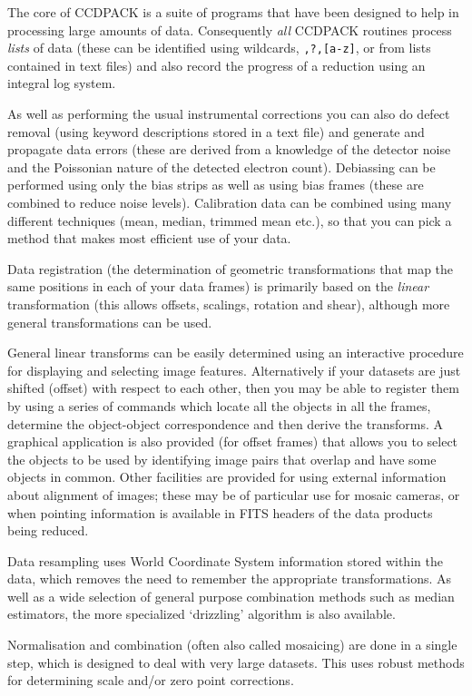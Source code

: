 \documentclass[twoside,11pt]{article}
\renewcommand{\_}{\texttt{\symbol{95}}}
\newcommand{\text}[1]{{\small \tt #1}}
\begin{document}
The core of CCDPACK is a suite of programs that have been designed to
help in processing large amounts of data.  Consequently {\em all}
CCDPACK routines process {\em lists} of data (these can be identified
using wildcards, \text{*,?,[a-z]}, or from lists contained in
text files) and also record the progress of a reduction using an
integral log system.

As well as performing the usual instrumental corrections you can
also do defect removal (using keyword descriptions stored in a text file)
and generate and propagate data errors (these are derived from a knowledge
of the detector noise and the Poissonian nature of the detected
electron count).
Debiassing can be performed using only the bias strips as well as
using bias frames (these are combined to reduce noise levels).
Calibration data can be combined using many different techniques
(mean, median, trimmed mean etc.), so that you can pick a method that
makes most efficient use of your data.

Data registration (the determination of geometric transformations that
map the same positions in each of your data frames) is primarily based
on the {\em linear} transformation (this allows offsets, scalings,
rotation and shear), although more general transformations can be
used.

General linear transforms can be easily determined using an
interactive procedure for displaying and selecting image features.
Alternatively if your datasets are just shifted (offset) with respect
to each other, then you may be able to register them by using a series
of commands which locate all the objects in all the frames,
determine the object-object correspondence and then derive the
transforms.
A graphical application is also provided (for offset frames) that allows
you to select the objects to be used by identifying image pairs that
overlap and have some objects in common.
Other facilities are provided for using external information about
alignment of images; these may be of particular use for mosaic
cameras, or when pointing information is available in FITS headers
of the data products being reduced.

Data resampling uses World Coordinate System information stored 
within the data, which removes the need to remember the
appropriate transformations. 
As well as a wide selection of general purpose combination methods 
such as median estimators, the more specialized `drizzling' 
algorithm is also available.

Normalisation and combination (often also called mosaicing) 
are done in a single step, which is
designed to deal with very large datasets.
This uses robust methods for determining scale and/or zero point
corrections.
\end{document}
